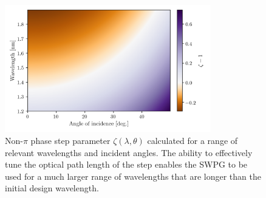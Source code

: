 \begin{figure}
	\centering
	\includegraphics[width=0.8\textwidth]{figures/Two_source/zeta_theta.png}
	\caption{Non-$\pi$ phase step parameter $\zeta(\lambda,\theta)$ calculated for a range of relevant wavelengths and incident angles.  The ability to effectively tune the optical path length of the step enables the SWPG to be used for a much larger range of wavelengths that are longer than the initial design wavelength.}
	\label{fig:zeta_theta}
\end{figure}

